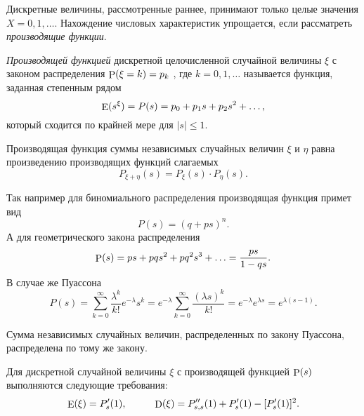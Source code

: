 Дискретные величины, рассмотренные раннее, принимают только целые значения $X = 0, 1, \ldots$. Нахождение числовых характеристик упрощается, если рассматреть \textit{производящие функции}.

\begin{to_def}
    \textit{Производящей функцией} дискретной целочисленной случайной величины $\xi$ с законом распределения
    $\P (\xi = k) = p_k$ , где $k = 0, 1, \ldots$ называется функция, заданная степенным рядом
    \begin{equation}
        \E(s^\xi) = P (s) = p_0 + p_1 s + p_2 s^2 + \ldots,
    \end{equation}
    который сходится по крайней мере для $|s| \leq 1$. 
\end{to_def}

\begin{to_thr}[]
    Производящая функция суммы независимых случайных величин $\xi$ и $\eta$ равна произведению производящих функций слагаемых
    \begin{equation}
        P_{\xi + \eta} (s) = P_\xi (s) \cdot P_\eta (s).
    \end{equation}
\end{to_thr}

Так например для биномиального распределения производящая функция примет вид
\begin{equation*}
    P (s) = (q + ps)^n.
\end{equation*}
А для геометрического закона распределения
\begin{equation*}
    \P (s) = p s + p q s^2 + p q^2 s^3 + \ldots = \frac{ps}{1-qs}.
\end{equation*}
В случае же Пуассона
\begin{equation*}
    P (s) = \sum_{k=0}^{\infty} \frac{\lambda^k}{k!}e^{-\lambda} s^k = e^{-\lambda} \sum_{k=0}^\infty 
    \frac{(\lambda s)^k}{k!} = e^{-\lambda} e^{\lambda s} = e^{\lambda (s-1)}.
\end{equation*}

\begin{to_thr}
    Сумма независимых случайных величин, распределенных по закону Пуассона, распределена по тому же закону.
\end{to_thr}

\begin{to_thr}[]
    Для дискретной случайной величины $\xi$ с производящей функцией $\P (s)$ выполняются следующие требования:
    \begin{equation}
        \E (\xi) = P'_s (1),
        \hspace{10 mm}
        \D (\xi) = P''_{s,s} (1) + P'_s (1) - [P'_{s} (1)]^2.
    \end{equation}
\end{to_thr}


